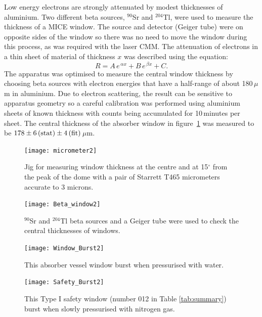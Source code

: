 Low energy electrons are strongly attenuated by modest thicknesses of aluminium. 
Two different beta sources, $^{90}$Sr and $^{204}$Tl, were used to measure the thickness of a MICE
window. The source and detector (Geiger tube) were on opposite sides
of the window so there was no need to 
move the window during this process, as was required with the laser CMM. 
The attenuation of electrons in a thin sheet of material of
thickness $x$ was described using the equation:
\begin{equation}
  R = A \, e^{\,\alpha x} + B\, e^{\,\beta x} + C.
\end{equation}
The apparatus was optimised to measure the central window thickness by
choosing beta sources with electron energies that have a half-range of
about 180\,$\mu$m in aluminium.
Due to electron scattering, the result can be sensitive to apparatus
geometry so a careful calibration was performed using aluminium sheets
of known thickness with
counts being accumulated for 10\,minutes per sheet.
The central thickness of the absorber window in figure~\ref{beta_rays}
was measured to be $178 \pm 6\,{\rm (stat)} \pm 4\,{\rm (fit)}$\,$\mu$m.

\begin{figure}
  \begin{minipage}{0.46\textwidth}
    \centerline{\texttt{[image: micrometer2]}}
    \caption{
      Jig for measuring window thickness at the centre and at 15$^{\circ}$
      from the peak of the dome with a pair of
      Starrett T465 micrometers accurate to 3 microns.
    } 
    \label{micrometers}
  \end{minipage}\hfill%
  \begin{minipage}{0.46\textwidth}
    \centerline{\texttt{[image: Beta\_window2]}}
    \caption{
      $^{90}$Sr and $^{204}$Tl beta sources and a Geiger tube were used to
      check the central thicknesses of windows.
    }
    \label{beta_rays}
  \end{minipage}
\end{figure}
\begin{figure}
  \begin{minipage}{0.46\textwidth}
    \centerline{\texttt{[image: Window\_Burst2]}}
    \caption{
      This absorber vessel window burst when pressurised with water.
    }  
    \label{Burst_Absorber}
  \end{minipage} \hfill
  \begin{minipage}{0.46\textwidth}
    \centerline{\texttt{[image: Safety\_Burst2]}}
    \caption{
      This Type I safety window (number 012 in Table \ref{tab:summary})
      burst when slowly pressurised with nitrogen gas.
    } 
    \label{Burst_Safety}
  \end{minipage}
\end{figure}


